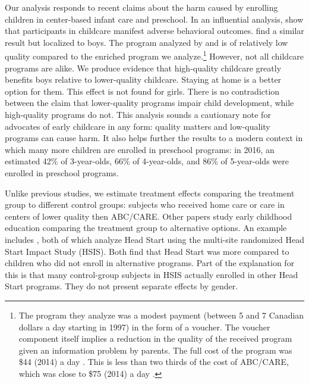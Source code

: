 Our analysis responds to recent claims about the harm caused by enrolling children in center-based infant care and preschool. In an influential analysis, \citet{Baker_Gruber_etal_2008_JPE} show that participants in childcare manifest adverse behavioral outcomes. \citet{Kottelenberg_Lehrer_2014_Gender-Effects} find a similar result but localized to boys.  The program analyzed by \citet{Baker_Gruber_Milligan_2015_Noncog_Defects} and \citet{Kottelenberg_Lehrer_2014_Gender-Effects} is of relatively low quality compared to the enriched program we analyze.\footnote{The program they analyze was a modest payment (between 5 and 7 Canadian dollars a day starting in 1997) in the form of a voucher. The voucher component itself implies a reduction in the quality of the received program given an information problem by parents. The full cost of the program was \$44 (2014) a day \citep{Baker_etal_2005_Universal_Childcare_NBER}. This is less than two thirds of the cost of ABC/CARE, which was close to \$75 (2014) a day \citep{Garcia_Heckman_Leaf_etal_2017_Comp_CBA_Unpublished}.} However, not all childcare programs are alike. We produce evidence that high-quality childcare greatly benefits boys relative to lower-quality childcare. Staying at home is a better option for them. This effect is not found for girls. There is no contradiction between the claim that lower-quality programs impair child development, while high-quality programs do not. This analysis sounds a cautionary note for advocates of early childcare in any form: quality matters and low-quality programs can cause harm. It also helps further the results to a modern context in which many more children are enrolled in preschool programs: in 2016, an estimated 42\% of 3-year-olds, 66\% of 4-year-olds, and 86\% of 5-year-olds were enrolled in preschool programs.

Unlike previous studies, we estimate treatment effects comparing the treatment group to different control groups: subjects who received home care or care in centers of lower quality then ABC/CARE. Other papers study early childhood education comparing the treatment group to alternative options. An example includes \citet{Feller_Grindal_etal_2016_ComparedtoWhat,Kline_Walters_2016_QJE}, both of which analyze Head Start using the multi-site randomized Head Start Impact Study (HSIS). Both find that Head Start was more compared to children who did not enroll in alternative programs. Part of the explanation for this is that many control-group subjects in HSIS actually enrolled in other Head Start programs. They do not present separate effects by gender. 

